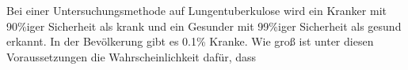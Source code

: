 \documentclass{abgabe}
\begin{document}
\begin{questions}
    \question
    Bei  einer  Untersuchungsmethode  auf  Lungentuberkulose  wird  ein  Kranker  mit 90\%iger Sicherheit  als  krank  und  ein  Gesunder  mit 99\%iger  Sicherheit  als  gesund  erkannt.  
    In der  Bevölkerung  gibt  es 0.1\% Kranke.  
    Wie  groß  ist  unter  diesen  Voraussetzungen  die Wahrscheinlichkeit dafür, dass    
\end{questions}
\end{document}
